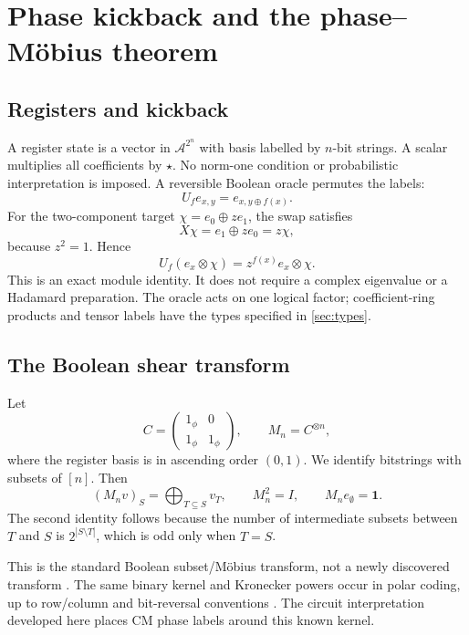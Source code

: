 \documentclass[11pt,a4paper]{article}
\theoremstyle{definition}\newtheorem{definition}[theorem]{Definition}
\theoremstyle{remark}\newtheorem{remark}[theorem]{Remark}
\newcommand{\alg}{\mathcal A}
\newcommand{\one}{1_{\phi}}
\numberwithin{equation}{section}
\begin{document}
\section{Phase kickback and the phase--M\"obius theorem}\label{sec:mobius}
\subsection{Registers and kickback}
A register state is a vector in $\alg^{2^n}$ with basis labelled by $n$-bit strings. A scalar multiplies all coefficients by $\star$. No norm-one condition or probabilistic interpretation is imposed. A reversible Boolean oracle permutes the labels:
\begin{equation}
 U_f e_{x,y}=e_{x,y\oplus f(x)}.
\end{equation}
For the two-component target $\chi=e_0\oplus z e_1$, the swap satisfies
\begin{equation}
 X\chi=e_1\oplus z e_0=z\chi,
\end{equation}
because $z^2=1$. Hence
\begin{equation}\label{eq:kickback}
 U_f(e_x\otimes\chi)=z^{f(x)}e_x\otimes\chi.
\end{equation}
This is an exact module identity. It does not require a complex eigenvalue or a Hadamard preparation. The oracle acts on one logical factor; coefficient-ring products and tensor labels have the types specified in \cref{sec:types}.

\subsection{The Boolean shear transform}
Let
\begin{equation}\label{eq:mobiusmatrix}
 C=\begin{pmatrix}\one&0\\\one&\one\end{pmatrix},
 \qquad M_n=C^{\otimes n},
\end{equation}
where the register basis is in ascending order $(0,1)$. We identify bitstrings with subsets of $[n]$. Then
\begin{equation}\label{eq:subset}
 (M_n v)_S=\bigoplus_{T\subseteq S}v_T,
 \qquad M_n^2=I,\qquad M_ne_\emptyset=\mathbf1.
\end{equation}
The second identity follows because the number of intermediate subsets between $T$ and $S$ is $2^{|S\setminus T|}$, which is odd only when $T=S$.

This is the standard Boolean subset/M\"obius transform, not a newly discovered transform \cite{barbier}. The same binary kernel and Kronecker powers occur in polar coding, up to row/column and bit-reversal conventions \cite{arikan}. The circuit interpretation developed here places CM phase labels around this known kernel.
\end{document}
